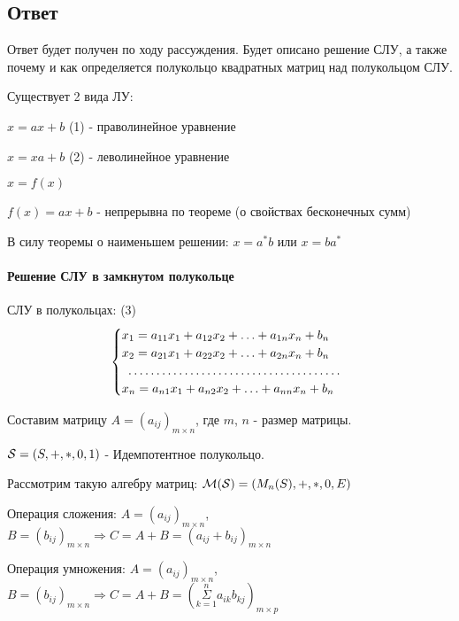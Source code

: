 \documentclass{report}
\begin{document}
\subsection{Ответ}
Ответ будет получен по ходу рассуждения. Будет описано решение СЛУ, а также
почему и как определяется полукольцо квадратных матриц над полукольцом СЛУ.

\medskip

Существует 2 вида ЛУ:

$x = ax + b$ (1) - праволинейное уравнение

$x = xa + b$ (2) - леволинейное уравнение

\medskip

$x = f(x)$

$f(x) = ax + b$ - непрерывна по теореме (о свойствах бесконечных сумм)

\medskip

В силу теоремы о наименьшем решении: $x = a^*b$ или $x = ba^*$

\paragraph*{Решение СЛУ в замкнутом полукольце}

СЛУ в полукольцах:  (3)
$$
	\begin{cases}
		x_1 = a_{11}x_1 + a_{12}x_2 + \ldots + a_{1n}x_n + b_n \\
		x_2 = a_{21}x_1 + a_{22}x_2 + \ldots + a_{2n}x_n + b_n \\
		\hdotsfor{1}                                           \\
		x_n = a_{n1}x_1 + a_{n2}x_2 + \ldots + a_{nn}x_n + b_n \\
	\end{cases}
$$

Составим матрицу $A = (a_{ij})_{m \times n}$, где $m$, $n$ - размер матрицы.

\medskip

${\cal S} = (S, +, *, 0, 1)$ - Идемпотентное полукольцо.

Рассмотрим такую алгебру матриц: ${\cal M(S)} = (M_n(S), +, *, 0, E)$

\medskip

Операция сложения:
$A = (a_{ij})_{m \times n}$, $B = (b_{ij})_{m \times n} \Rightarrow
	C = A + B = (a_{ij} + b_{ij})_{m \times n}$

Операция умножения:
$A = (a_{ij})_{m \times n}$, $B = (b_{ij})_{m \times n} \Rightarrow
	C = A + B = (\underset{k=1}{\overset{n}{\Sigma}}a_{ik}b_{kj})_{m \times p}$
\end{document}
